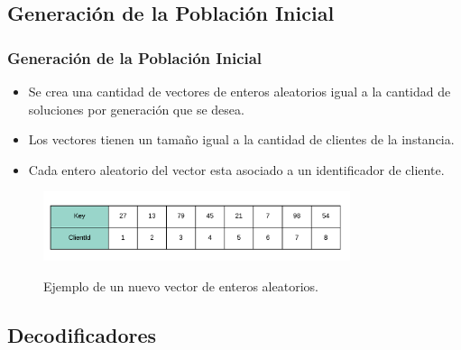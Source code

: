 \documentclass{beamer}
\begin{document}

\subsection{Generación de la Población Inicial}

\begin{frame}
\frametitle{Generación de la Población Inicial}

\begin{itemize}
    \item Se crea una cantidad de vectores de enteros aleatorios igual a la cantidad de soluciones por generación que se desea.
    \pause
    \item Los vectores tienen un tamaño igual a la cantidad de clientes de la instancia.
    \pause
    \item Cada entero aleatorio del vector esta asociado a un identificador de cliente.
    \pause
\end{itemize}

\begin{figure}[h]
	\caption{Ejemplo de un nuevo vector de enteros aleatorios.}
	\centering
	\includegraphics[width=9cm]{RandomKeysInicializado}
	\label{fig:RandomKeysInicializado}
\end{figure}

\end{frame}


\subsection{Decodificadores}
\end{document}
